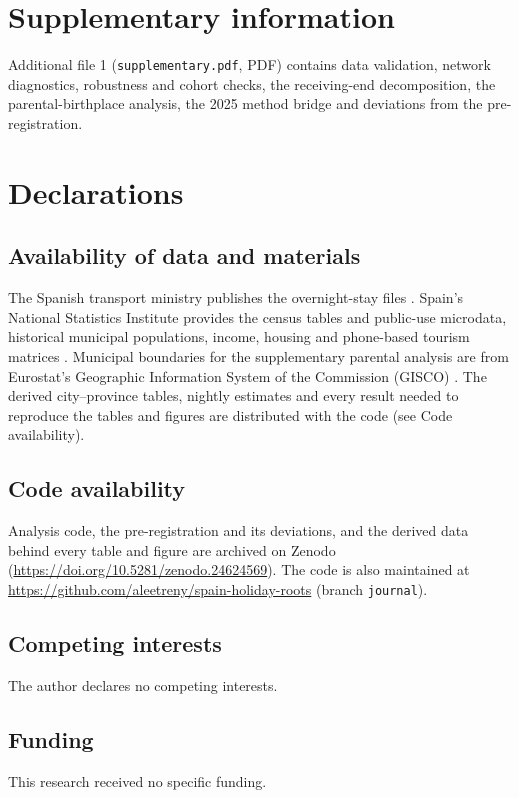\documentclass[pdflatex,sn-mathphys-num,referee]{sn-jnl}
\begin{document}
\backmatter

\section*{Supplementary information}\label{sec:si-file}
Additional file 1 (\nolinkurl{supplementary.pdf}, PDF) contains data validation, network diagnostics, robustness and cohort checks, the receiving-end decomposition, the parental-birthplace analysis, the 2025 method bridge and deviations from the pre-registration.

\section*{Declarations}

\subsection*{Availability of data and materials}
The Spanish transport ministry publishes the overnight-stay files \cite{mitmaovernightfiles}. Spain's National Statistics Institute provides the census tables and public-use microdata, historical municipal populations, income, housing and phone-based tourism matrices \cite{ine2026table68545,ine2025censo,ine2026intercensal,ine2026adrh,ine2023viviendas,ine2026turismomoviles,ine2023ecepovmicro}. Municipal boundaries for the supplementary parental analysis are from Eurostat's Geographic Information System of the Commission (GISCO) \cite{gisco2021lau}. The derived city--province tables, nightly estimates and every result needed to reproduce the tables and figures are distributed with the code (see Code availability).

\subsection*{Code availability}
Analysis code, the pre-registration and its deviations, and the derived data behind every table and figure are archived on Zenodo (\url{https://doi.org/10.5281/zenodo.24624569}). The code is also maintained at \url{https://github.com/aleetreny/spain-holiday-roots} (branch \texttt{journal}).

\subsection*{Competing interests}
The author declares no competing interests.

\subsection*{Funding}
This research received no specific funding.
\end{document}
